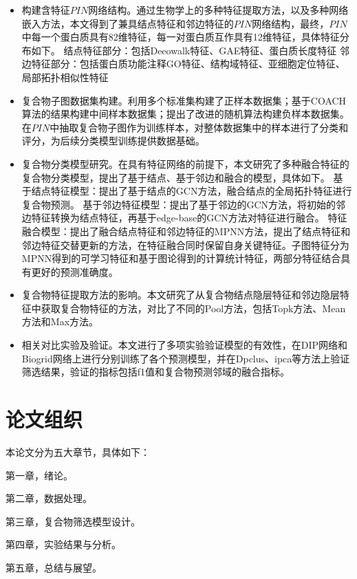 \begin{itemize}
  \item 构建含特征$PIN$网络结构。通过生物学上的多种特征提取方法，以及多种网络嵌入方法，本文得到了兼具结点特征和邻边特征的$PIN$网络结构，最终，$PIN$中每一个蛋白质具有82维特征，每一对蛋白质互作具有12维特征，具体特征分布如下。
  \subitem 结点特征部分：包括Deeowalk特征、GAE特征、蛋白质长度特征
  \subitem 邻边特征部分：包括蛋白质功能注释GO特征、结构域特征、亚细胞定位特征、局部拓扑相似性特征
  \item 复合物子图数据集构建。利用多个标准集构建了正样本数据集；基于COACH算法的结果构建中间样本数据集；提出了改进的随机算法构建负样本数据集。在$PIN$中抽取复合物子图作为训练样本，对整体数据集中的样本进行了分类和评分，为后续分类模型训练提供数据基础。
  \item 复合物分类模型研究。在具有特征网络的前提下，本文研究了多种融合特征的复合物分类模型，提出了基于结点、基于邻边和融合的模型，具体如下。
  \subitem 基于结点特征模型：提出了基于结点的GCN方法，融合结点的全局拓扑特征进行复合物预测。
  \subitem 基于邻边特征模型：提出了基于邻边的GCN方法，将初始的邻边特征转换为结点特征，再基于edge-base的GCN方法对特征进行融合。
  \subitem 特征融合模型：提出了融合结点特征和邻边特征的MPNN方法，提出了结点特征和邻边特征交替更新的方法，在特征融合同时保留自身关键特征。子图特征分为MPNN得到的可学习特征和基于图论得到的计算统计特征，两部分特征结合具有更好的预测准确度。
  \item 复合物特征提取方法的影响。本文研究了从复合物结点隐层特征和邻边隐层特征中获取复合物特征的方法，对比了不同的Pool方法，包括Topk方法、Mean方法和Max方法。
  \item 相关对比实验及验证。本文进行了多项实验验证模型的有效性，在DIP网络和Biogrid网络上进行分别训练了各个预测模型，并在Dpclus、ipca等方法上验证筛选结果，验证的指标包括f1值和复合物预测邻域的融合指标。
\end{itemize}

\section{论文组织}
\label{section:intro:organization}

本论文分为五大章节，具体如下：

第一章，绪论。

第二章，数据处理。

第三章，复合物筛选模型设计。

第四章，实验结果与分析。

第五章，总结与展望。